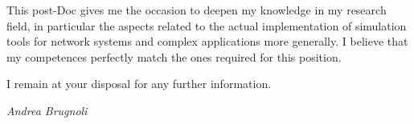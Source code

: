 \documentclass[11pt]{letter}
\begin{document}
	This post-Doc gives me the occasion to deepen my knowledge in my research field, in particular the aspects related to the actual implementation of simulation tools for network systems and complex applications more generally. I believe that my competences perfectly match the ones required for this position.
	
 
	I remain at your disposal for any further information. 
	
	
	
	
	\begin{center}
		\large\textit{Andrea Brugnoli}
	\end{center}
\end{document}
